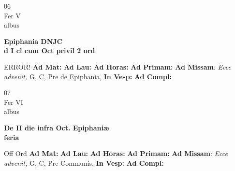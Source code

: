 \documentclass[10pt, openany]{book}
\begin{document}
    \begin{center}
        \begin{minipage}{3.5in}
            \vspace{2em}
            \begin{minipage}{0.5in}
                {\Huge 06} \\
                {\normalsize Fer V} \\
                {\normalsize albus}
            \end{minipage}
            \begin{minipage}{3.0in}
                \textbf{ \large Epiphania DNJC \\
                \textnormal{\normalsize d I cl cum Oct privil 2 ord}} \\ 
            \end{minipage}
            \begin{justify}ERROR!
                \textbf{Ad Mat: }
                \textbf{Ad Lau: }
                \textbf{Ad Horas: }
                \textbf{Ad Primam: }\textbf{Ad Missam}: \textit{Ecce advenit,} G, C, Pre de Epiphania,  
                \textbf{In Vesp: }
                \textbf{Ad Compl: }
            \end{justify}
        \end{minipage}
    \end{center}

    \begin{center}
        \begin{minipage}{3.5in}
            \vspace{2em}
            \begin{minipage}{0.5in}
                {\Huge 07} \\
                {\normalsize Fer VI} \\
                {\normalsize albus}
            \end{minipage}
            \begin{minipage}{3.0in}
                \textbf{ \large De II die infra Oct. Epiphaniæ \\
                \textnormal{\normalsize feria}} \\ 
            \end{minipage}
            \begin{justify}Off Ord
                \textbf{Ad Mat: }
                \textbf{Ad Lau: }
                \textbf{Ad Horas: }
                \textbf{Ad Primam: }\textbf{Ad Missam}: \textit{Ecce advenit,} G, C, Pre Communis,  
                \textbf{In Vesp: }
                \textbf{Ad Compl: }
            \end{justify}
        \end{minipage}
    \end{center}
\end{document}
